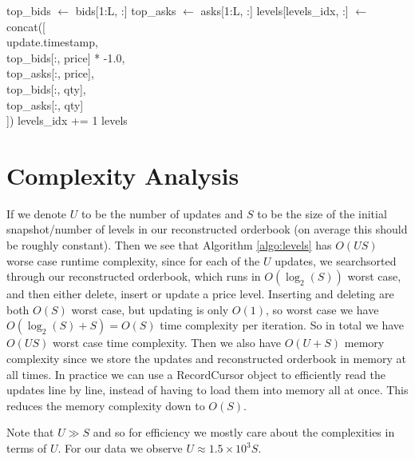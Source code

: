 \begin{algorithm*}
\begin{algorithmic}[1]
        
         
            \State top\_bids $\gets$ bids[1:L, :]
            \State top\_asks $\gets$ asks[1:L, :]
            \State levels[levels\_idx, :] $\gets$ concat([ \\
            \hspace{65pt}    update.timestamp, \\
            \hspace{65pt}  top\_bids[:, price] * -1.0, \\
            \hspace{65pt}  top\_asks[:, price],\\
            \hspace{65pt}  top\_bids[:, qty],\\
            \hspace{65pt}  top\_asks[:, qty]\\
            \hspace{47pt}])
            \State levels\_idx += 1
        \EndIf
    \EndFor
    \State \Return levels
\EndFunction
\end{algorithmic}
\label{algo:levels}
\end{algorithm*}

\section{Complexity Analysis}

If we denote $U$ to be the number of updates and $S$ to be the size of the initial snapshot/number of levels
in our reconstructed orderbook (on average this should be roughly constant). Then we see that 
Algorithm \ref{algo:levels} has $O(US)$ worse case runtime complexity, since for each of the $U$ 
updates, we searchsorted through our reconstructed orderbook, which runs in $O(\log_2(S))$ worst case,
and then either delete, insert or update a price level. Inserting and deleting are both $O(S)$ worst case,
but updating is only $O(1)$, so worst case we have $O(\log_2(S) + S) = O(S)$  time complexity per
iteration. So in total we have $O(US)$ worst case time complexity. Then we also have $O(U + S)$ memory
complexity since we store the updates and reconstructed orderbook in memory at all times. 
In practice we can use a RecordCursor object to efficiently read the updates line by line, instead
of having to load them into memory all at once. This reduces the memory complexity down to $O(S)$.

Note that $U \gg S$ and so for efficiency we mostly care about the complexities in terms of $U$. 
For our data we observe $U \approx 1.5 \times 10^3 S$.

